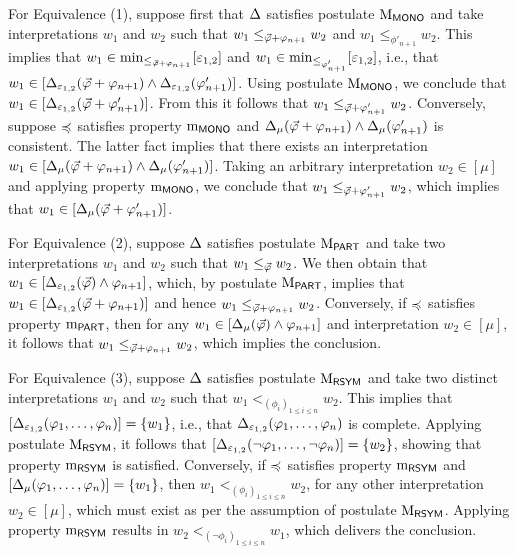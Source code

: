 \begin{prf*}{}{}%
	For Equivalence (1), suppose first that $\me$ satisfies postulate $\ppm{\MONO}$
	and take interpretations $w_1$ and $w_2$ such that 
	$w_1 \le_{\P+\phi_{n+1}}w_2$ and $w_1 \le_{\phi'_{n+1}}w_2$.
	This implies that $w_1\in\min_{\le_{\P+\phi_{n+1}}}[\px_{1,2}]$ and $w_1\in\min_{\le_{\phi'_{n+1}}}[\px_{1,2}]$,
	i.e., that $w_1\in[\me_{\px_{1,2}}(\P+\phi_{n+1})\land \me_{\px_{1,2}}(\phi'_{n+1})]$.
	Using postulate $\ppm{\MONO}$, we conclude that $w_1\in[\me_{\px_{1,2}}(\P+\phi'_{n+1})]$.
	From this it follows that $w_1\le_{\P+\phi'_{n+1}}w_2$.
	Conversely, suppose $\as$ satisfies property $\oom{\MONO}$ and 
	$\me_{\mu}(\P+\phi_{n+1})\land \me_{\mu}(\phi'_{n+1})$ is consistent.
	The latter fact implies that there exists an interpretation 
	$w_1\in[\me_{\mu}(\P+\phi_{n+1})\land \me_{\mu}(\phi'_{n+1})]$.
	Taking an arbitrary interpretation $w_2\in[\mu]$ and applying property $\oom{\MONO}$, 
	we conclude that 
	$w_1 \le_{\P+\phi'_{n+1}}w_2$, which implies that $w_1\in[\me_{\mu}(\P+\phi'_{n+1})]$.

	For Equivalence (2), suppose $\me$ satisfies postulate $\ppm{\PART}$
	and take two interpretations $w_1$ and $w_2$ such that $w_1 \le_{\P} w_2$.
	We then obtain that $w_1\in[\me_{\px_{1,2}}(\P)\land\phi_{n+1}]$, 
	which, by postulate $\ppm{\PART}$, implies that $w_1\in[\me_{\px_{1,2}}(\P+\phi_{n+1})]$
	and hence $w_1 \le_{\P+\phi_{n+1}}w_2$.
	Conversely, if $\as$ satisfies property $\oom{\PART}$, 
	then for any $w_1\in[\me_{\mu}(\P)\land\phi_{n+1}]$ and 
	interpretation $w_2\in[\mu]$, it follows that $w_1 \le_{\P+\phi_{n+1}}w_2$,
	which implies the conclusion.

	For Equivalence (3), suppose $\me$ satisfies postulate $\ppm{\RSYM}$
	and take two distinct interpretations $w_1$ and $w_2$ such that $w_1 <_{(\phi_i)_{1\le i \le n}} w_2$.
	This implies that $[\me_{\px_{1,2}}(\phi_1,\dots,\phi_n)]=\{w_1\}$, i.e., that $\me_{\px_{1,2}}(\phi_1,\dots,\phi_n)$
	is complete. Applying postulate $\ppm{\RSYM}$, it follows that $[\me_{\px_{1,2}}(\lnot\phi_1,\dots,\lnot\phi_n)]=\{w_2\}$,
	showing that property $\oom{\RSYM}$ is satisfied.
	Conversely, if $\as$ satisfies property $\oom{\RSYM}$ and $[\me_{\mu}(\phi_1,\dots,\phi_n)]=\{w_1\}$,
	then $w_1<_{(\phi_i)_{1\le i \le n}}w_2$, for any other interpretation $w_2\in[\mu]$, which must exist as
	per the assumption of postulate $\ppm{\RSYM}$. Applying property $\oom{\RSYM}$ results in 
	$w_2<_{(\lnot\phi_i)_{1\le i \le n}}w_1$, which delivers the conclusion.	


\end{prf*}
